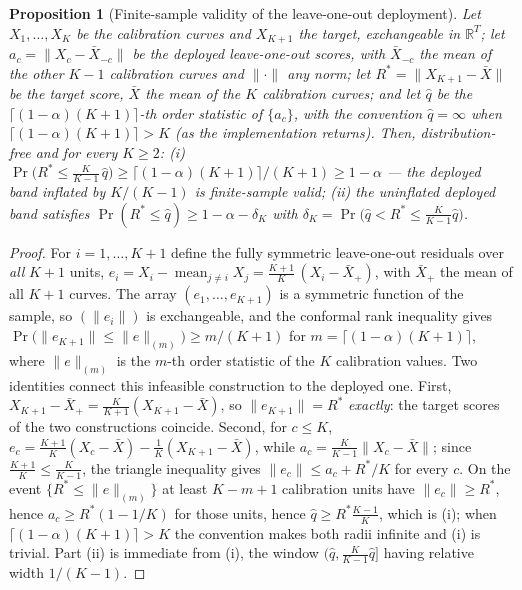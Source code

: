\documentclass[12pt]{article}
\newtheorem{proposition}{Proposition}
\theoremstyle{definition}
\theoremstyle{remark}
\begin{document}
\begin{proposition}[Finite-sample validity of the leave-one-out deployment]
\label{prop:loo}
Let $X_1,\dots,X_K$ be the calibration curves and $X_{K+1}$ the target,
exchangeable in $\mathbb R^T$; let
$a_c=\lVert X_c-\bar X_{-c}\rVert$ be the deployed leave-one-out scores,
with $\bar X_{-c}$ the mean of the other $K{-}1$ calibration curves and
$\lVert\cdot\rVert$ any norm; let $R^*=\lVert X_{K+1}-\bar X\rVert$ be the
target score, $\bar X$ the mean of the $K$ calibration curves; and let
$\widehat q$ be the $\lceil(1-\alpha)(K{+}1)\rceil$-th order statistic of
$\{a_c\}$, with the convention $\widehat q=\infty$ when
$\lceil(1-\alpha)(K{+}1)\rceil>K$ (as the implementation returns). Then,
distribution-free and for every $K\ge2$:
\emph{(i)}
$\Pr\!\big(R^*\le\tfrac{K}{K-1}\,\widehat q\big)
\ge\lceil(1-\alpha)(K{+}1)\rceil/(K{+}1)\ge1-\alpha$ ---
the deployed band inflated by $K/(K{-}1)$ is finite-sample valid;
\emph{(ii)} the uninflated deployed band satisfies
$\Pr(R^*\le\widehat q)\ge1-\alpha-\delta_K$ with
$\delta_K=\Pr\big(\widehat q<R^*\le\tfrac{K}{K-1}\widehat q\big)$.
\end{proposition}

\begin{proof}
For $i=1,\dots,K{+}1$ define the fully symmetric leave-one-out residuals over
\emph{all} $K{+}1$ units, $e_i=X_i-\operatorname{mean}_{j\ne i}X_j
=\tfrac{K+1}{K}\,(X_i-\bar X_+)$, with $\bar X_+$ the mean of all $K{+}1$
curves. The array $(e_1,\dots,e_{K+1})$ is a symmetric function of the sample,
so $(\lVert e_i\rVert)$ is exchangeable, and the conformal rank inequality
gives $\Pr\big(\lVert e_{K+1}\rVert\le
\lVert e\rVert_{(m)}\big)\ge m/(K{+}1)$ for
$m=\lceil(1-\alpha)(K{+}1)\rceil$, where $\lVert e\rVert_{(m)}$ is the
$m$-th order statistic of the $K$ calibration values. Two identities connect
this infeasible construction to the deployed one. First,
$X_{K+1}-\bar X_+=\tfrac{K}{K+1}(X_{K+1}-\bar X)$, so
$\lVert e_{K+1}\rVert=R^*$ \emph{exactly}: the target scores of the two
constructions coincide. Second, for $c\le K$,
$e_c=\tfrac{K+1}{K}(X_c-\bar X)-\tfrac1K(X_{K+1}-\bar X)$, while
$a_c=\tfrac{K}{K-1}\lVert X_c-\bar X\rVert$; since
$\tfrac{K+1}{K}\le\tfrac{K}{K-1}$, the triangle inequality gives
$\lVert e_c\rVert\le a_c+R^*/K$ for every $c$. On the event
$\{R^*\le\lVert e\rVert_{(m)}\}$ at least $K-m+1$ calibration units have
$\lVert e_c\rVert\ge R^*$, hence $a_c\ge R^*(1-1/K)$ for those units, hence
$\widehat q\ge R^*\tfrac{K-1}{K}$, which is (i); when
$\lceil(1-\alpha)(K{+}1)\rceil>K$ the convention makes both radii infinite and
(i) is trivial. Part (ii) is immediate from (i), the window
$(\widehat q,\tfrac{K}{K-1}\widehat q]$ having relative width $1/(K{-}1)$.
\end{proof}
\end{document}
